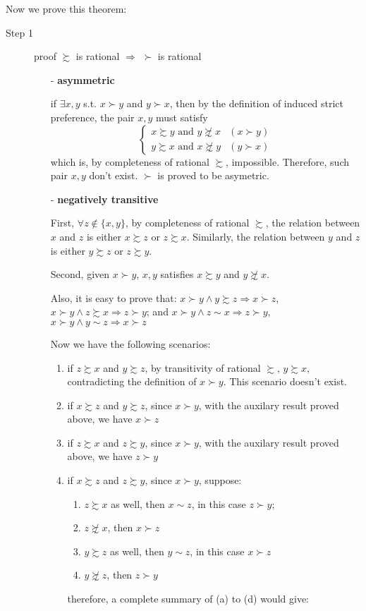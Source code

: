 Now we prove this theorem:
\begin{description}
    \item[Step 1] proof $\succsim$ is rational $\Rightarrow$ $\succ$ is rational
    \begin{itemize}
        \item[-] \textbf{asymmetric}
        
        if $\exists x,y$ s.t. $x\succ y$ and $y\succ x$, then by the definition of induced strict preference, the pair $x,y$ must satisfy 
        $$\begin{cases}
        x\succsim y\text{ and }y\not\succsim x & (x\succ y)\\
        y\succsim x\text{ and }x\not\succsim y & (y\succ x)
        \end{cases}$$
        which is, by completeness of rational $\succsim$, impossible. Therefore, such pair $x,y$ don't exist. $\succ$ is proved to be asymetric.
        
        \item[-] \textbf{negatively transitive}
        
        First, $\forall z\notin\{x,y\}$, by completeness of rational $\succsim$, the relation between $x$ and $z$ is either $x\succsim z$ or $z\succsim x$.
        Similarly, the relation between $y$ and $z$ is either $y\succsim z$ or $z\succsim y$.
        
        Second, given $x\succ y$, $x,y$ satisfies $x\succsim y$ and $y\not\succsim x$.
        
        Also, it is easy to prove that: $x\succ y \land y\succsim z \Rightarrow x\succ z$, $x\succ y \land z\succsim x\Rightarrow z\succ y$; and $x\succ y\land z\sim x\Rightarrow z\succ y$, $x\succ y\land y\sim z\Rightarrow x\succ z$

        Now we have the following scenarios:
        \begin{enumerate}
        \item if $z\succsim x$ and $y\succsim z$, by transitivity of rational
        $\succsim$, $y\succsim x$, contradicting the definition of $x\succ y$.
        This scenario doesn't exist.
        \item if $x\succsim z$ and $y\succsim z$, since $x\succ y$, with the
        auxilary result proved above, we have $x\succ z$
        \item if $z\succsim x$ and $z\succsim y$, since $x\succ y$, with the
        auxilary result proved above, we have $z\succ y$
        \item if $x\succsim z$ and $z\succsim y$, since $x\succ y$, suppose:
        \begin{enumerate}
        \item $z\succsim x$ as well, then $x\sim z$, in this case $z\succ y$;
        \item $z\not\succsim x$, then $x\succ z$
        \item $y\succsim z$ as well, then $y\sim z$, in this case $x\succ z$
        \item $y\not\succsim z$, then $z\succ y$
        \end{enumerate}
        therefore, a complete summary of (a) to (d) would give:
        

\end{enumerate}
\end{itemize}
\end{description}
